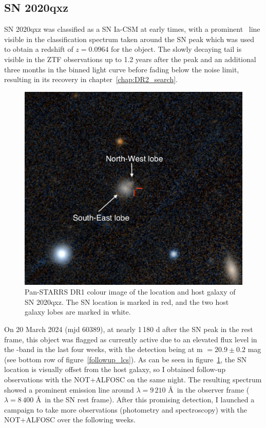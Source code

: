 \documentclass[a4paper,oneside,12pt, class=Latex/Classes/PhDthesisPSnPDF, crop=false]{standalone}
\begin{document}
\subsection{SN 2020qxz}
\label{sec:SN2020qxz}
SN 2020qxz was classified as a SN Ia-CSM at early times, with a prominent \Halpha\ line visible in the classification spectrum taken around the SN peak which was used to obtain a redshift of $z=0.0964$ for the object. The slowly decaying tail is visible in the ZTF observations up to 1.2 years after the peak and an additional three months in the binned light curve before fading below the noise limit, resulting in its recovery in chapter~\ref{chap:DR2_search}.

\begin{figure}
    \centering
    \includegraphics[width=\textwidth]{../Images/chapter_5/2020qxz_loc.png}
    \caption[Pan-STARRS DR1 colour image of the SN 2020qxz location and host.]{Pan-STARRS DR1 colour image of the location and host galaxy of SN 2020qxz. The SN location is marked in red, and the two host galaxy lobes are marked in white.}
    \label{2020qxz_loc}
\end{figure}

On 20 March 2024 (mjd 60389), at nearly 1\,180 d after the SN peak in the rest frame, this object was flagged as currently active due to an elevated flux level in the \ztfi-band in the last four weeks, with the detection being at m $=20.9\pm 0.2$ mag (see bottom row of figure~\ref{followup_lcs}). As can be seen in figure~\ref{2020qxz_loc}, the SN location is visually offset from the host galaxy, so I obtained follow-up observations with the NOT+ALFOSC on the same night. The resulting spectrum showed a prominent emission line around $\lambda=9\,210$ \AA\ in the observer frame ($\lambda=8\,400$ \AA\ in the SN rest frame). After this promising detection, I launched a campaign to take more observations (photometry and spectroscopy) with the NOT+ALFOSC over the following weeks.
\end{document}

